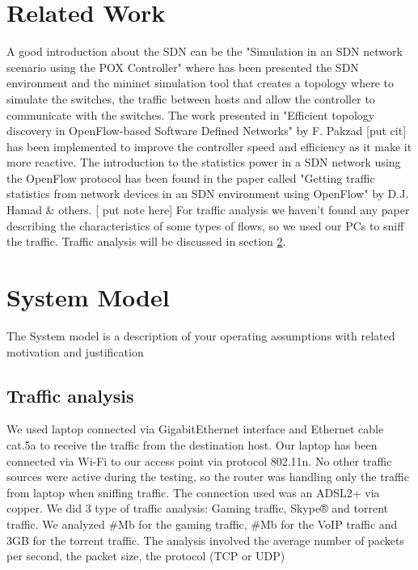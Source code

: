 \documentclass[conference,10pt]{IEEEtran}
\begin{document}
\section{Related Work}\label{sec:sota}
A good introduction about the SDN can be the  "Simulation in an SDN network scenario using the
POX Controller" where has been presented the SDN environment and the mininet simulation
tool that creates a topology where to simulate the switches, the traffic between hosts and
allow the controller to communicate with the switches. The work presented in
"Efficient topology discovery in OpenFlow-based Software Defined Networks" by F. Pakzad [put cit]
has been implemented to improve the controller speed and efficiency as it make it more reactive.
The introduction to the statistics power in a SDN network using the OpenFlow protocol has been found
in the paper called "Getting traffic statistics from network devices in an
SDN environment using OpenFlow" by D.J. Hamad & others. [ put note here]
For traffic analysis we haven't found any paper describing the characteristics of
some types of flows, so we used our PCs to sniff the traffic. Traffic analysis will be discussed in section \ref{sec:symo}.


\section{System Model}\label{sec:symo}
The System model is a description of your operating assumptions with related motivation and justification


\subsection{Traffic analysis}
We used laptop connected via
GigabitEthernet interface and Ethernet cable cat.5a to receive the traffic from the destination host.
Our laptop has been connected via Wi-Fi to our access point via protocol 802.11n.
No other traffic sources were active during the testing, so the router was handling only
the traffic from laptop when sniffing traffic. The connection used was an ADSL2+ via copper.
We did 3 type of traffic analysis: Gaming traffic, Skype® and torrent traffic. We analyzed
#Mb for the gaming traffic, #Mb for the VoIP traffic and 3GB for the torrent traffic.
The analysis involved the average number of packets per second, the packet size, the protocol (TCP or UDP)
\end{document}
